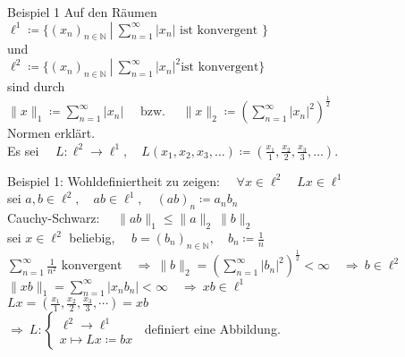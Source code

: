 \documentclass[AERbeamer%
,optBeamerClassicFormat%
,optLeftEquations   %
]{AERlatex}
\begin{document}
    \begin{frame}{Beispiel 1}
        \setlength{\baselineskip}{1.3\baselineskip}
        Auf den Räumen \\
        $\ell^1\coloneqq \{\left(x_n\right)_{n \in \mathbb{N}} ~ \left| ~ \sum_{n=1}^{\infty} \right. |x_n| \text { ist konvergent }\}$ \\
        und \\
        $\ell^2\coloneqq \{\left(x_n\right)_{n \in \mathbb{N}} ~ \left| ~ \sum_{n=1}^{\infty} \right. \left|x_n\right|^2 \text{ist konvergent} \}$ \\
        sind durch \\
        $\|x\|_1\coloneqq\sum_{n=1}^{\infty}\left|x_n\right| \quad \text { bzw. } \quad\|x\|_2\coloneqq\left(\sum_{n=1}^{\infty}\left|x_n\right|^2\right)^{\frac{1}{2}}$ \\
        Normen erklärt. \\
        Es sei $\quad L: \ell^2 \rightarrow \ell^1, \quad L\left(x_1, x_2, x_3, \ldots\right)\coloneqq\left(\frac{x_1}{1}, \frac{x_2}{2}, \frac{x_3}{3}, \ldots\right)$.
    \end{frame}
%
    \begin{frame}{Beispiel 1: Wohldefiniertheit}
        \setlength{\baselineskip}{1.6\baselineskip}
        zu zeigen: $\quad \forall x \in \ell^2 \quad L x \in \ell^1$ \\ \pause
        sei $a, b \in \ell^2, \quad a b \in \ell^1, \quad (a b)_n\coloneqq a_n b_n$ \\ \pause
        Cauchy-Schwarz: $\quad \|a b\|_1 \leq\|a\|_2~\|b\|_2$ \\ \pause
        sei $x \in \ell^2$ beliebig, $\quad b=\left(b_n\right)_{n \in \mathbb{N}}, \quad b_n\coloneqq\frac{1}{n}$ \\ \pause
        $\sum_{n=1}^{\infty} \frac{1}{n^2} \text { konvergent} \quad \Rightarrow ~\|b\|_2=\left(\sum_{n=1}^{\infty}\left|b_n\right|^2\right)^{\frac{1}{2}}<\infty \quad \Rightarrow ~ b \in \ell^2$ \\ \pause
        $\|x b\|_1=\sum_{n=1}^{\infty}\left|x_n b_n\right|<\infty \quad \Rightarrow ~ x b \in \ell^1$ \\ \pause
        $L x=\left(\frac{x_1}{1}, \frac{x_2}{2}, \frac{x_3}{3}, \cdots\right)=x b$ \\ \pause
        \vspace{0.5em}
        $\Rightarrow ~ L:\left\{\begin{array}{l}
                                    \ell^2 \rightarrow \ell^1 \\ x \mapsto L x\coloneqq b x
        \end{array}\right.~$  definiert eine Abbildung.
    \end{frame}
\end{document}
